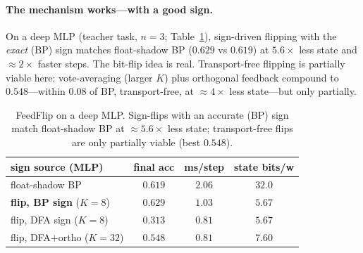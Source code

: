 \documentclass[11pt]{article}
\begin{document}
\paragraph{The mechanism works---with a good sign.} On a deep MLP (teacher task, $n{=}3$; Table~\ref{tab:flip-mlp}), sign-driven flipping with the \emph{exact} (BP) sign matches float-shadow BP ($0.629$ vs $0.619$) at $5.6\times$ less state and $\approx\!2\times$ faster steps. The bit-flip idea is real. Transport-free flipping is partially viable here: vote-averaging (larger $K$) plus orthogonal feedback compound to $0.548$---within $0.08$ of BP, transport-free, at $\approx\!4\times$ less state---but only partially.
\begin{table}[H]
\centering\footnotesize
\begin{tabular}{@{}lccc@{}}
\toprule
sign source (MLP) & final acc & ms/step & state bits/w \\
\midrule
float-shadow BP & $0.619$ & $2.06$ & $32.0$ \\
\textbf{flip, BP sign} ($K{=}8$) & $\mathbf{0.629}$ & $1.03$ & $\mathbf{5.67}$ \\
flip, DFA sign ($K{=}8$) & $0.313$ & $0.81$ & $5.67$ \\
flip, DFA$+$ortho ($K{=}32$) & $0.548$ & $0.81$ & $7.60$ \\
\bottomrule
\end{tabular}
\caption{FeedFlip on a deep MLP. Sign-flips with an accurate (BP) sign match float-shadow BP at $\approx\!5.6\times$ less state; transport-free flips are only partially viable (best $0.548$).}
\label{tab:flip-mlp}
\end{table}
\end{document}
